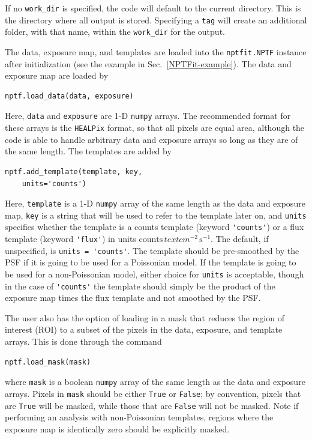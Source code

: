 If no \lstinline{work_dir} is specified, the code will default to the current directory.  This is the directory where all output is stored.  Specifying a \lstinline{tag} will create an additional folder, with that name, within the \lstinline{work_dir} for the output.

The data, exposure map, and templates are loaded into the \lstinline{nptfit.NPTF} instance after initialization (see the example in Sec.~\ref{NPTFit-example}).  The data and exposure map are loaded by 
\begin{lstlisting}
nptf.load_data(data, exposure)
\end{lstlisting}
Here, \lstinline{data} and \lstinline{exposure} are 1-D \texttt{numpy} arrays.  The recommended format for these arrays is the \texttt{HEALPix} format, so that all pixels are equal area, although the code is able to handle arbitrary data and exposure arrays so long as they are of the same length.  The templates are added by 
\begin{lstlisting}
nptf.add_template(template, key, 
    units='counts')
\end{lstlisting}  
Here, \lstinline{template} is a 1-D  \texttt{numpy} array of the same length as the data and exposure map, \lstinline{key} is a string that will be used to refer to the template later on, and \lstinline{units} specifies whether the template is a counts template (keyword \lstinline{'counts'}) or a flux template (keyword \lstinline{'flux'}) in units  $\text{counts}\,text{cm}^{-2}\,\text{s}^{-1}$.  The default, if unspecified, is \lstinline{units = 'counts'}.  The template should be pre-smoothed by the PSF if it is going to be used for a Poissonian model.  If the template is going to be used for a non-Poissonian model, either choice for \lstinline{units} is acceptable, though in the case of \lstinline{'counts'} the template should simply be the product of the exposure map times the flux template and not smoothed by the PSF. 

The user also has the option of loading in a mask that reduces the region of interest (ROI) to a subset of the pixels in the data, exposure, and template arrays.  This is done through the command
\begin{lstlisting}
nptf.load_mask(mask)
\end{lstlisting}
where \lstinline{mask} is a boolean \texttt{numpy} array of the same length as the data and exposure arrays.  Pixels in \lstinline{mask} should be either \texttt{True} or \texttt{False}; by convention, pixels that are \texttt{True} will be masked, while those that are \texttt{False} will not be masked.  Note if performing an analysis with non-Poissonian templates, regions where the exposure map is identically zero should be explicitly masked. 

